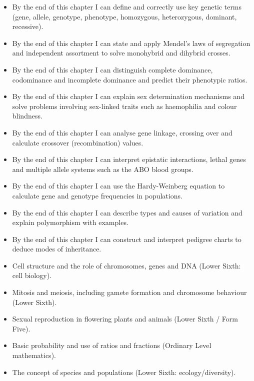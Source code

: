 \documentclass[11pt]{article}
\begin{document}
\begin{objectifs}
\begin{itemize}
\item By the end of this chapter I can define and correctly use key genetic terms (gene, allele, genotype, phenotype, homozygous, heterozygous, dominant, recessive).
\item By the end of this chapter I can state and apply Mendel's laws of segregation and independent assortment to solve monohybrid and dihybrid crosses.
\item By the end of this chapter I can distinguish complete dominance, codominance and incomplete dominance and predict their phenotypic ratios.
\item By the end of this chapter I can explain sex determination mechanisms and solve problems involving sex-linked traits such as haemophilia and colour blindness.
\item By the end of this chapter I can analyse gene linkage, crossing over and calculate crossover (recombination) values.
\item By the end of this chapter I can interpret epistatic interactions, lethal genes and multiple allele systems such as the ABO blood groups.
\item By the end of this chapter I can use the Hardy-Weinberg equation to calculate gene and genotype frequencies in populations.
\item By the end of this chapter I can describe types and causes of variation and explain polymorphism with examples.
\item By the end of this chapter I can construct and interpret pedigree charts to deduce modes of inheritance.
\end{itemize}
\end{objectifs}

\begin{prerequis}
\begin{itemize}
\item Cell structure and the role of chromosomes, genes and DNA (Lower Sixth: cell biology).
\item Mitosis and meiosis, including gamete formation and chromosome behaviour (Lower Sixth).
\item Sexual reproduction in flowering plants and animals (Lower Sixth / Form Five).
\item Basic probability and use of ratios and fractions (Ordinary Level mathematics).
\item The concept of species and populations (Lower Sixth: ecology/diversity).
\end{itemize}
\end{prerequis}
\end{document}
